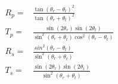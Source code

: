 \begin{align}
R_p = & \frac{\tan(\theta_r-\theta_t)^2}{\tan(\theta_r+\theta_t)^2}\\
T_p = & \frac{\sin(2\theta_r)\sin(2\theta_t)}{\sin^2(\theta_r+\theta_t)\cos^2(\theta_r-\theta_t)}\\
R_s = & \frac{sin^2(\theta_r-\theta_t)}{\sin^2(\theta_r+\theta_t)}\\
T_s = & \frac{\sin(2\theta_r)\sin(2\theta_t)}{\sin^2(\theta_r+\theta_t)}
\end{align}

	







